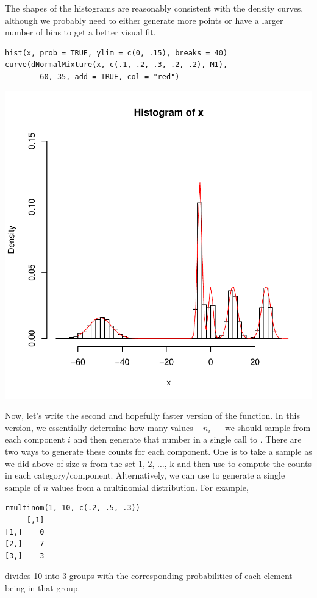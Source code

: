 \documentclass{article}
\begin{document}
\begin{description}
The shapes of the histograms are reasonably
consistent with the density curves, although
we probably need to either generate more
points or have a larger number of bins to get a better
visual fit.
\begin{verbatim}
hist(x, prob = TRUE, ylim = c(0, .15), breaks = 40)
curve(dNormalMixture(x, c(.1, .2, .3, .2, .2), M1), 
       -60, 35, add = TRUE, col = "red")
\end{verbatim}
\includegraphics{images/mixtureSample1a.pdf}

Now, let's write the second and hopefully faster version of the
 function.  In this version, we essentially
determine how many values -- $n_i$ --- we should sample from each
component $i$ and then generate that number in a single call to
.  There are two ways to generate these counts for
each component. One is to take a sample as we did above of size $n$
from the set 1, 2, $\ldots$, k and then use  to
compute the counts in each category/component.  Alternatively, we can
use  to generate a single sample of $n$ values
from a multinomial distribution.
For example, 
\begin{verbatim}
rmultinom(1, 10, c(.2, .5, .3))
     [,1]
[1,]    0
[2,]    7
[3,]    3
\end{verbatim}
divides 10 into 3 groups with the corresponding probabilities of each
element being in that group.


\end{description}
\end{document}
